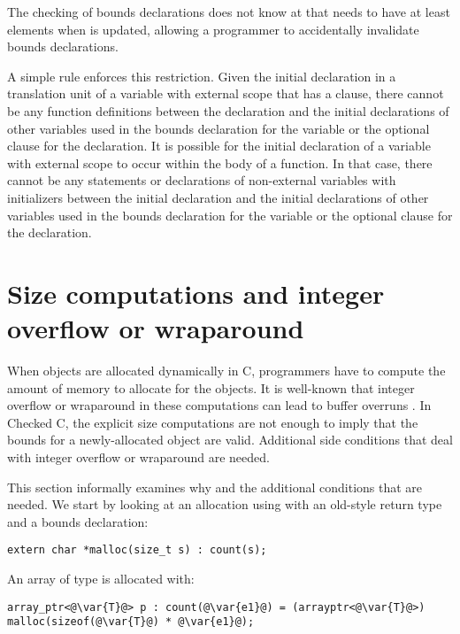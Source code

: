 The checking of bounds declarations does not know at
 that  needs to have at least 
elements when  is updated, allowing a programmer to accidentally
invalidate bounds declarations.

A simple rule enforces this restriction. Given the initial declaration
in a translation unit of a variable with external scope that has a
 clause, there cannot be any function definitions between
the declaration and the initial declarations of other variables used in
the bounds declaration for the variable or the optional  clause for the declaration.
It is possible for the initial declaration of
a variable with external scope to occur within the body of a function.
In that case, there cannot be any statements or declarations of
non-external variables with initializers between the initial declaration
and the initial declarations of other variables used in the
bounds declaration for the variable or the optional  clause for
the declaration.

\section{Size computations and integer overflow or wraparound}
\label{section:integer-overflow-informal}

When objects are allocated dynamically in C, programmers have to compute
the amount of memory to allocate for the objects. It is well-known
that integer overflow or wraparound in these computations can lead to buffer
overruns \cite{Howard2003,Mitre2015-128,Mitre2015-190,Mitre2015-680,Dietz2015}.
 In Checked C, the explicit size computations are not enough
to imply that the bounds for a newly-allocated object are valid.
Additional side conditions that deal with integer overflow or wraparound
are needed.

This section informally examines why and the additional conditions that
are needed. We start by looking at an allocation using  with an
old-style  return type and a bounds declaration:

\begin{lstlisting}
extern char *malloc(size_t s) : count(s);
\end{lstlisting}

An array of type  is allocated with:

\begin{lstlisting}[escapechar=\@]
array_ptr<@\var{T}@> p : count(@\var{e1}@) = (arrayptr<@\var{T}@>) malloc(sizeof(@\var{T}@) * @\var{e1}@);
\end{lstlisting}

